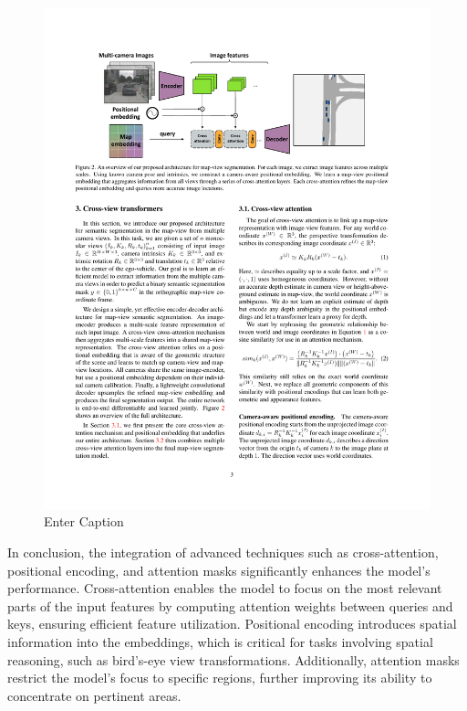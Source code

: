 \begin{figure}[H]
    \centering
    \includegraphics[width=1\linewidth]{LateX//figs/2205.02833v1.pdf}
    \caption{Enter Caption \cite{zhou2022crossviewtransformersrealtimemapview}}
    \label{fig:enter-label}
\end{figure}

In conclusion, the integration of advanced techniques such as cross-attention, positional encoding, and attention masks significantly enhances the model's performance. Cross-attention enables the model to focus on the most relevant parts of the input features by computing attention weights between queries and keys, ensuring efficient feature utilization. Positional encoding introduces spatial information into the embeddings, which is critical for tasks involving spatial reasoning, such as bird’s-eye view transformations. Additionally, attention masks restrict the model's focus to specific regions, further improving its ability to concentrate on pertinent areas.

